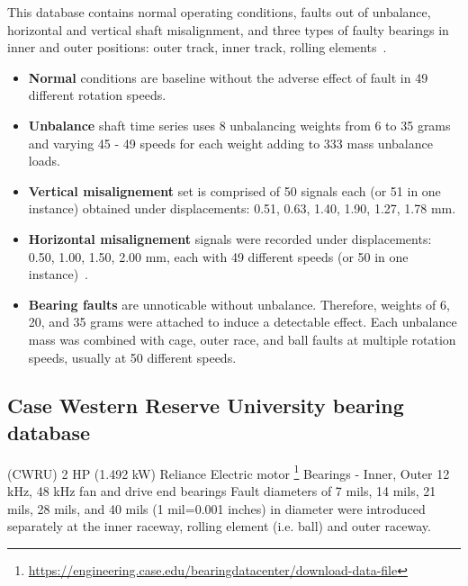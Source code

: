 This database contains normal operating conditions, faults out of unbalance, horizontal and vertical shaft misalignment, and three types of faulty bearings in inner and outer positions: outer track, inner track, rolling elements~\cite{pestana-viana_influence_2016}.
\begin{itemize}
\itemsep0pt
\item \textbf{Normal} conditions are baseline without the adverse effect of fault in 49 different rotation speeds. 
\item \textbf{Unbalance} shaft time series uses 8 unbalancing weights from 6 to 35 grams and varying 45 - 49 speeds for each weight adding to 333 mass unbalance loads. 
\item \textbf{Vertical misalignement} set is comprised of 50 signals each (or 51 in one instance) obtained under displacements: 0.51, 0.63, 1.40, 1.90, 1.27, 1.78 mm.
\item \textbf{Horizontal misalignement} signals were recorded under displacements: 0.50, 1.00, 1.50, 2.00 mm, each with 49 different speeds (or 50 in one instance)~\cite{pestana-viana_influence_2016}.
\item \textbf{Bearing faults} are unnoticable without unbalance. Therefore, weights of 6, 20, and 35 grams were attached to induce a detectable effect. Each unbalance mass was combined with cage, outer race, and ball faults at multiple rotation speeds, usually at 50 different speeds.
\end{itemize}

\subsection{Case Western Reserve University bearing database}
(CWRU) 
2 HP (1.492 kW) Reliance Electric motor \footnote{\url{https://engineering.case.edu/bearingdatacenter/download-data-file}}
Bearings - Inner, Outer
12 kHz, 48 kHz
fan and drive end bearings
Fault diameters of 7 mils, 14 mils, 21 mils, 28 mils, and 40 mils (1 mil=0.001 inches) in diameter were introduced separately at the inner raceway, rolling element (i.e. ball) and outer raceway. 


